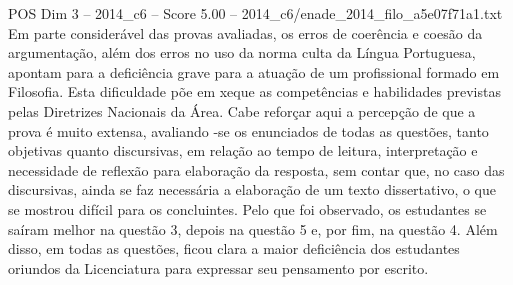 \begin{textsample}{POS Dim 3 – 2014\_c6 – Score 5.00 – 2014\_c6/enade\_2014\_filo\_a5e07f71a1.txt}
Em parte considerável das provas avaliadas, os erros de coerência e coesão da argumentação, além dos erros no uso da norma culta da Língua Portuguesa, apontam para a deficiência grave para a atuação de um profissional formado em Filosofia.
Esta dificuldade põe em xeque as competências e habilidades previstas pelas Diretrizes Nacionais da Área.
Cabe reforçar aqui a percepção de que a prova é muito extensa, avaliando -se os enunciados de todas as questões, tanto objetivas quanto discursivas, em relação ao tempo de leitura, interpretação e necessidade de reflexão para elaboração da resposta, sem contar que, no caso das discursivas, ainda se faz necessária a elaboração de um texto dissertativo, o que se mostrou difícil para os concluintes.
Pelo que foi observado, os estudantes se saíram melhor na questão 3, depois na questão 5 e, por fim, na questão 4.
Além disso, em todas as questões, ficou clara a maior deficiência dos estudantes oriundos da Licenciatura para expressar seu pensamento por escrito.

\end{textsample}
